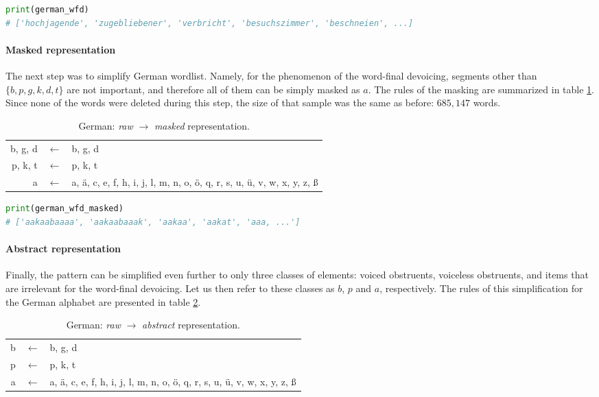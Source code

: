 \begin{lstlisting}[language=Python]
print(german_wfd)
# ['hochjagende', 'zugebliebener', 'verbricht', 'besuchszimmer', 'beschneien', ...]
\end{lstlisting}


\paragraph{Masked representation}

The next step was to simplify German wordlist.
Namely, for the phenomenon of the word-final devoicing, segments other than $\{b, p, g, k, d, t\}$ are not important, and therefore all of them can be simply masked as $a$.
The rules of the masking are summarized in table \ref{germanmap1}.
Since none of the words were deleted during this step, the size of that sample was the same as before: $685,147$ words.

\begin{table}[h!]
\begin{center}
\begin{tabular}{rcl}
b, g, d & $\leftarrow$ & b, g, d \\
p, k, t & $\leftarrow$ & p, k, t \\
a & $\leftarrow$ & a, \"a, c, e, f, h, i, j, l, m, n, o, \"o, q, r, s, u, \"u, v, w, x, y, z, \ss
\end{tabular}
\end{center}
\caption{German: \emph{raw} $\rightarrow$ \emph{masked} representation.}
\label{germanmap1}
\end{table}

\begin{lstlisting}[language=Python]
print(german_wfd_masked)
# ['aakaabaaaa', 'aakaabaaak', 'aakaa', 'aakat', 'aaa, ...']
\end{lstlisting}

\paragraph{Abstract representation}

Finally, the pattern can be simplified even further to only three classes of elements: voiced obstruents, voiceless obstruents, and items that are irrelevant for the word-final devoicing.
Let us then refer to these classes as $b$, $p$ and $a$, respectively.
The rules of this simplification for the German alphabet are presented in table \ref{germanmap2}.

\begin{table}[h!]
\begin{center}
\begin{tabular}{rcl}
b & $\leftarrow$ & b, g, d \\
p & $\leftarrow$ & p, k, t \\
a & $\leftarrow$ & a, \"a, c, e, f, h, i, j, l, m, n, o, \"o, q, r, s, u, \"u, v, w, x, y, z, \ss
\end{tabular}
\end{center}
\caption{German: \emph{raw} $\rightarrow$ \emph{abstract} representation.}
\label{germanmap2}
\end{table}

